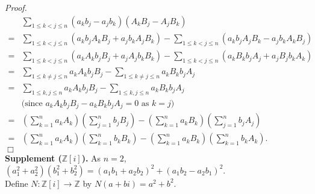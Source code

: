 \documentclass{article}
\begin{document}
\emph{Proof.}
\begin{align*}
&\sum_{1 \leq k < j \leq n}
(a_k b_j - a_j b_k)(A_k B_j - A_j B_k) \\
= &\sum_{1 \leq k < j \leq n}
(a_k b_j A_k B_j + a_j b_k A_j B_k)
- \sum_{1 \leq k < j \leq n}
(a_k b_j A_j B_k - a_j b_k A_k B_j) \\
= &\sum_{1 \leq k < j \leq n}
(a_k A_k b_j B_j + a_j A_j b_k B_k)
- \sum_{1 \leq k < j \leq n}
(a_k B_k b_j A_j + a_j B_j b_k A_k) \\
= &\sum_{1 \leq k \neq j \leq n} a_k A_k b_j B_j
 - \sum_{1 \leq k \neq j \leq n} a_k B_k b_j A_j \\
= &\sum_{1 \leq k, j \leq n} a_k A_k b_j B_j
 - \sum_{1 \leq k, j \leq n} a_k B_k b_j A_j \\
  & \text{(since $a_k A_k b_j B_j - a_k B_k b_j A_j = 0$ as $k = j$)} \\
= &\left( \sum_{k=1}^{n} a_k A_k \right)\left( \sum_{j=1}^{n} b_j B_j \right)
- \left( \sum_{k=1}^{n} a_k B_k \right)\left( \sum_{j=1}^{n} b_j A_j \right) \\
= &\left( \sum_{k=1}^{n} a_k A_k \right)\left( \sum_{k=1}^{n} b_k B_k \right)
- \left( \sum_{k=1}^{n} a_k B_k \right)\left( \sum_{k=1}^{n} b_k A_k \right).
\end{align*}
$\Box$ \\

\textbf{Supplement ($\mathbb{Z}[i]$).}
As $n = 2$,
$(a_1^2 + a_2^2)(b_1^2 + b_2^2)
= (a_1 b_1 + a_2 b_2)^2 + (a_1 b_2 - a_2 b_1)^2$. \\

Define $N: \mathbb{Z}[i] \rightarrow \mathbb{Z}$ by
$N(a+bi) = a^2 + b^2$.
\end{document}

